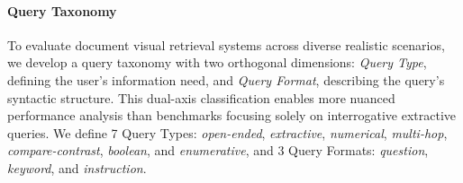 \paragraph{Query Taxonomy} To evaluate document visual retrieval systems across diverse realistic scenarios, we develop a query taxonomy with two orthogonal dimensions: \textit{Query Type}, defining the user's information need, and \textit{Query Format}, describing the query's syntactic structure. This dual-axis classification enables more nuanced performance analysis than benchmarks focusing solely on interrogative extractive queries. We define 7 Query Types: \textit{open-ended}, \textit{extractive}, \textit{numerical}, \textit{multi-hop}, \textit{compare-contrast}, \textit{boolean}, and \textit{enumerative}, and 3 Query Formats: \textit{question}, \textit{keyword}, and \textit{instruction}. %






